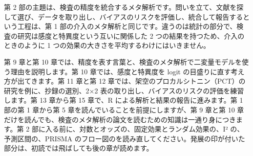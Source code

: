 第 2 部の主題は、検査の精度を統合するメタ解析です。問いを立て、文献を探して選び、データを取り出し、バイアスのリスクを評価し、統合して報告するという工程は、第 1 部の介入のメタ解析と同じです。違うのは統計の部分で、検査の研究は感度と特異度という互いに関係した 2 つの結果を持つため、介入のときのように 1 つの効果の大きさを平均するわけにはいきません。

第 9 章と第 10 章では、精度を表す言葉と、検査のメタ解析で二変量モデルを使う理由を説明します。第 10 章では、感度と特異度を logit の目盛りに直す考え方が出てきます。第 11 章と第 12 章では、架空のプロカルシトニン（PCT）の研究を例に、抄録の選別、2×2 表の取り出し、バイアスのリスクの評価を練習します。第 13 章から第 15 章で、R による解析と結果の報告に進みます。第 1 部の第 1 章から第 5 章を読んでいることを前提にしますが、第 9 章と第 10 章だけを読んでも、検査のメタ解析の論文を読むための知識は一通り身につきます。第 2 部に入る前に、対数とオッズの、固定効果とランダム効果の、I² の、予測区間の、PRISMA のフロー図のを読み直してください。発展の印が付いた部分は、初読では飛ばしても後の章が読めます。
